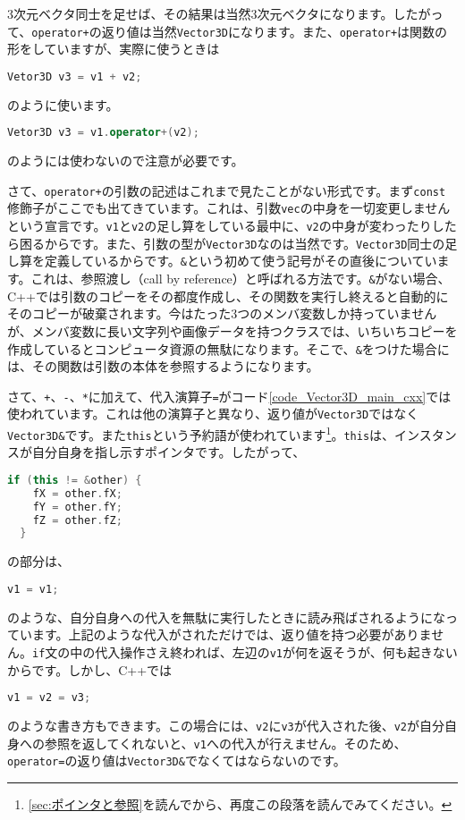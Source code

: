 3次元ベクタ同士を足せば、その結果は当然3次元ベクタになります。したがって、\texttt{operator+}の返り値は当然\texttt{Vector3D}になります。また、\texttt{operator+}は関数の形をしていますが、実際に使うときは
\begin{lstlisting}[language=c++]
Vetor3D v3 = v1 + v2;
\end{lstlisting}
のように使います。
\begin{lstlisting}[language=c++]
Vetor3D v3 = v1.operator+(v2);
\end{lstlisting}
のようには使わないので注意が必要です。

さて、\texttt{operator+}の引数の記述はこれまで見たことがない形式です。まず\texttt{const}修飾子がここでも出てきています。これは、引数\texttt{vec}の中身を一切変更しませんという宣言です。\texttt{v1}と\texttt{v2}の足し算をしている最中に、\texttt{v2}の中身が変わったりしたら困るからです。また、引数の型が\texttt{Vector3D}なのは当然です。\texttt{Vector3D}同士の足し算を定義しているからです。\texttt{\&}という初めて使う記号がその直後についています。これは、参照渡し（call by reference）と呼ばれる方法です。\texttt{\&}がない場合、C++では引数のコピーをその都度作成し、その関数を実行し終えると自動的にそのコピーが破棄されます。今はたった3つのメンバ変数しか持っていませんが、メンバ変数に長い文字列や画像データを持つクラスでは、いちいちコピーを作成しているとコンピュータ資源の無駄になります。そこで、\texttt{\&}をつけた場合には、その関数は引数の本体を参照するようになります。

さて、\texttt{+}、\texttt{-}、\texttt{*}に加えて、代入演算子\texttt{=}がコード\ref{code_Vector3D_main_cxx}では使われています。これは他の演算子と異なり、返り値が\texttt{Vector3D}ではなく\texttt{Vector3D\&}です。また\texttt{this}という予約語が使われています\footnote{\ref{sec:ポインタと参照}を読んでから、再度この段落を読んでみてください。}。\texttt{this}は、インスタンスが自分自身を指し示すポインタです。したがって、
\begin{lstlisting}[language=c++]
  if (this != &other) { 
    fX = other.fX; 
    fY = other.fY; 
    fZ = other.fZ; 
  } 
\end{lstlisting}
の部分は、
\begin{lstlisting}[language=c++]
v1 = v1;
\end{lstlisting}
のような、自分自身への代入を無駄に実行したときに読み飛ばされるようになっています。上記のような代入がされただけでは、返り値を持つ必要がありません。\texttt{if}文の中の代入操作さえ終われば、左辺の\texttt{v1}が何を返そうが、何も起きないからです。しかし、C++では
\begin{lstlisting}[language=c++]
v1 = v2 = v3;
\end{lstlisting}
のような書き方もできます。この場合には、\texttt{v2}に\texttt{v3}が代入された後、\texttt{v2}が自分自身への参照を返してくれないと、\texttt{v1}への代入が行えません。そのため、\texttt{operator=}の返り値は\texttt{Vector3D\&}でなくてはならないのです。

